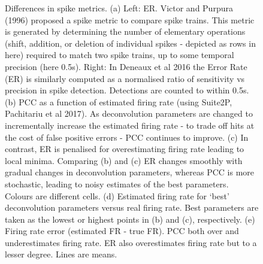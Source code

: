 \documentclass[a4paper]{article}
\begin{document}
\begin{figure}
\caption{\label{fig:deconv_metrics1} Differences in spike metrics. (a) Left: ER. Victor and Purpura (1996) proposed a spike metric to compare spike trains. This metric is generated by determining the number of elementary operations (shift, addition, or deletion of individual spikes - depicted as rows in here) required to match two spike trains, up to some temporal precision (here 0.5s). Right: In Deneaux et al 2016 the Error Rate (ER) is similarly computed as a normalised ratio of sensitivity vs precision in spike detection. Detections are counted to within 0.5s. 
(b) PCC as a function of estimated firing rate (using Suite2P, Pachitariu et al 2017). As deconvolution parameters are changed to incrementally increase the estimated firing rate - to trade off hits at the cost of false positive errors - PCC continues to improve. (c) In contrast, ER is penalised for overestimating firing rate leading to local minima. Comparing (b) and (c) ER changes smoothly with gradual changes in deconvolution parameters, whereas PCC is more stochastic, leading to noisy estimates of the best parameters. Colours are different cells. (d) Estimated firing rate for `best' deconvolution parameters versus real firing rate. Best parameters are taken as the lowest or highest points in (b) and (c), respectively. (e) Firing rate error (estimated FR - true FR). PCC both over and underestimates firing rate. ER also overestimates firing rate but to a lesser degree. Lines are means.}
\end{figure}
\end{document}
